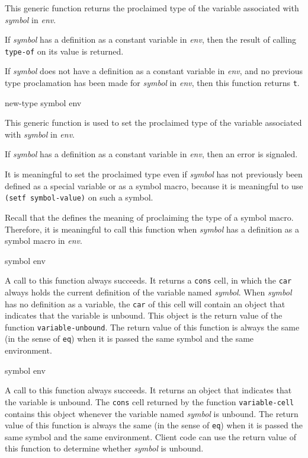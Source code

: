 This generic function returns the proclaimed type of the variable
associated with \textit{symbol} in \textit{env}.

If \textit{symbol} has a definition as a constant variable in \textit{env},
then the result of calling \texttt{type-of} on its value is returned.

If \textit{symbol} does not have a definition as a constant variable in
\textit{env}, and no previous type proclamation has been made for
\textit{symbol} in \textit{env}, then this function returns \texttt{t}.

 {new-type symbol env}

This generic function is used to set the proclaimed type of the
variable associated with \textit{symbol} in \textit{env}.

If \textit{symbol} has a definition as a constant variable in \textit{env},
then an error is signaled.

It is meaningful to set the proclaimed type even if \textit{symbol}
has not previously been defined as a special variable or as a symbol
macro, because it is meaningful to use \texttt{(setf symbol-value)} on
such a symbol.

Recall that the \hs{} defines the meaning of proclaiming the
type of a symbol macro.  Therefore, it is meaningful to call this
function when \textit{symbol} has a definition as a symbol macro in
\textit{env}.

 {symbol env}

A call to this function always succeeds.  It returns a \texttt{cons}
cell, in which the \texttt{car} always holds the current definition of
the variable named \textit{symbol}.  When \textit{symbol} has no
definition as a variable, the \texttt{car} of this cell will contain
an object that indicates that the variable is unbound.  This object is
the return value of the function \texttt{variable-unbound}.  The
return value of this function is always the same (in the sense
of \texttt{eq}) when it is passed the same symbol and the same
environment.

 {symbol env}

A call to this function always succeeds.  It returns an object that
indicates that the variable is unbound.  The \texttt{cons} cell
returned by the function \texttt{variable-cell} contains this object
whenever the variable named \textit{symbol} is unbound.  The return
value of this function is always the same (in the sense
of \texttt{eq}) when it is passed the same symbol and the same
environment.  Client code can use the return value of this function to
determine whether
\textit{symbol} is unbound.

